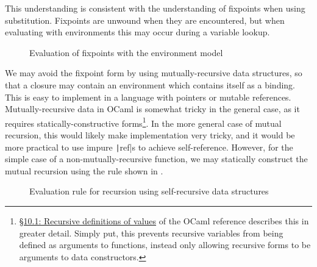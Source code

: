 This understanding is consistent with the understanding of fixpoints when using substitution. Fixpoints are unwound when they are encountered, but when evaluating with environments this may occur during a variable lookup.

\begin{figure}
  \centering
  \begin{mdframed}
    \begin{singlespace}
      
    \end{singlespace}
  \end{mdframed}
  \caption{Evaluation of fixpoints with the environment model}
  \label{fig:fixpoint-rules}
\end{figure}

We may avoid the fixpoint form by using mutually-recursive data structures, so that a closure may contain an environment which contains itself as a binding. This is easy to implement in a language with pointers or mutable references. Mutually-recursive data in OCaml is somewhat tricky in the general case, as it requires statically-constructive forms\footnote{\href{https://ocaml.org/manual/letrecvalues.html}{\S10.1: Recursive definitions of values} of the OCaml reference describes this in greater detail. Simply put, this prevents recursive variables from being defined as arguments to functions, instead only allowing recursive forms to be arguments to data constructors.}. In the more general case of mutual recursion, this would likely make implementation very tricky, and it would be more practical to use impure \texttt|ref|s to achieve self-reference. However, for the simple case of a non-mutually-recursive function, we may statically construct the mutual recursion using the rule shown in .

\begin{figure}
  \centering
  \begin{mdframed}
    \begin{singlespace}
      \begin{mathpar}
      \end{mathpar}
    \end{singlespace}
  \end{mdframed}
  \caption{Evaluation rule for recursion using self-recursive data structures}
  \label{fig:rec-closures-let}
\end{figure}

